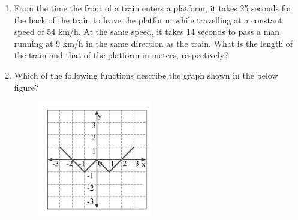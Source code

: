 \documentclass[a4paper,10pt]{article}
\begin{document}
\begin{enumerate}
    \item From the time the front of a train enters a platform, it takes 25 seconds for the back of the train to leave the platform, while travelling at a constant speed of 54 km/h. At the same speed, it takes 14 seconds to pass a man running at 9 km/h in the same direction as the train. What is the length of the train and that of the platform in meters, respectively?
    \hfill{}
    \begin{enumerate}[label=\Alph*)]
    \end{enumerate}

    \item Which of the following functions describe the graph shown in the below figure?
    \begin{figure}[H]
        \centering
        \includegraphics[width=0.4\columnwidth]{GAq9.png}
        \caption*{}
        \label{fig:q9_ga}
    \end{figure}
    \hfill{}
    \begin{enumerate}[label=\Alph*)]
    \end{enumerate}


\end{enumerate}
\end{document}
